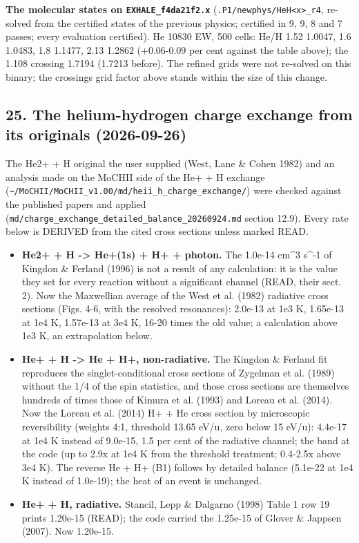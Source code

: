 \documentclass[english,a4paper]{my_memo}
\providecommand{\tightlist}{\setlength{\itemsep}{0pt}\setlength{\parskip}{0pt}}
\begin{document}
\textbf{The molecular states on \texttt{EXHALE\_f4da21f2.x}} (\texttt{.P1/newphys/HeH\textless{}x\textgreater{}\_r4},
re-solved from the certified states of the previous physics; certified in
9, 9, 8 and 7 passes; every evaluation certified). He 10830 EW, 500 cells:
He/H 1.52 1.0047, 1.6 1.0483, 1.8 1.1477, 2.13 1.2862 (+0.06-0.09 per cent
against the table above); the 1.108 crossing 1.7194 (1.7213 before). The
refined grids were not re-solved on this binary; the crossing\textquotesingle s grid factor
above stands within the size of this change.

\subsection{25. The helium-hydrogen charge exchange from its originals (2026-09-26)}\label{25-the-helium-hydrogen-charge-exchange-from-its-originals-2026-09-26}

The He2+ + H original the user supplied (West, Lane \& Cohen 1982) and an
analysis made on the MoCHII side of the He+ + H exchange
(\texttt{\textasciitilde{}/MoCHII/MoCHII\_v1.00/md/heii\_h\_charge\_exchange/}) were checked against
the published papers and applied (\texttt{md/charge\_exchange\_detailed\_balance\_20260924.md}
section 12.9). Every rate below is DERIVED from the cited cross sections
unless marked READ.

\begin{itemize}
\tightlist
\item
  \textbf{He2+ + H -\textgreater{} He+(1s) + H+ + photon.} The 1.0e-14 cm\^{}3 s\^{}-1 of Kingdon \&
  Ferland (1996) is not a result of any calculation: it is the value they set
  for every reaction without a significant channel (READ, their sect. 2).
  Now the Maxwellian average of the West et al. (1982) radiative cross
  sections (Figs. 4-6, with the resolved resonances): 2.0e-13 at 1e3 K,
  1.65e-13 at 1e4 K, 1.57e-13 at 3e4 K, 16-20 times the old value; a
  calculation above 1e3 K, an extrapolation below.
\item
  \textbf{He+ + H -\textgreater{} He + H+, non-radiative.} The Kingdon \& Ferland fit reproduces
  the singlet-conditional cross sections of Zygelman et al. (1989) without
  the 1/4 of the spin statistics, and those cross sections are themselves
  hundreds of times those of Kimura et al. (1993) and Loreau et al. (2014).
  Now the Loreau et al. (2014) H+ + He cross section by microscopic
  reversibility (weights 4:1, threshold 13.65 eV/u, zero below 15 eV/u):
  4.4e-17 at 1e4 K instead of 9.0e-15, 1.5 per cent of the radiative channel;
  the band at the code (up to 2.9x at 1e4 K from the threshold treatment;
  0.4-2.5x above 3e4 K). The reverse He + H+ (B1) follows by detailed balance
  (5.1e-22 at 1e4 K instead of 1.0e-19); the heat of an event is unchanged.
\item
  \textbf{He+ + H, radiative.} Stancil, Lepp \& Dalgarno (1998) Table 1 row 19
  prints 1.20e-15 (READ); the code carried the 1.25e-15 of Glover \& Jappsen
  (2007). Now 1.20e-15.
\end{itemize}
\end{document}
